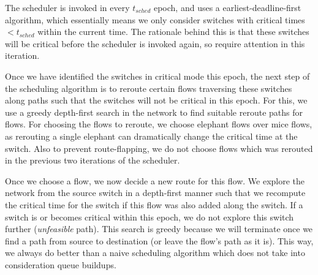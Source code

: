 The scheduler is invoked in every $t_{sched}$ epoch, and uses a 
earliest-deadline-first algorithm, which essentially means we only consider
switches with critical times $< t_{sched}$ within the current time. The rationale 
behind this is that these switches will be critical before the scheduler is invoked 
again, so require attention in this iteration. 

Once we have identified the switches in critical mode this epoch,
the next step of the scheduling algorithm is to reroute certain flows 
traversing these switches along paths 
such that the switches will not be critical in this epoch. For this, we use 
a greedy depth-first search in the network to find suitable reroute paths for
flows. For choosing the flows to reroute, we choose elephant flows over mice flows,
as rerouting a single elephant can dramatically change the critical time at the switch.
Also to prevent route-flapping, we do not choose flows which was rerouted in the previous
two iterations of the scheduler. 

Once we choose a flow, we now decide a new route for this flow. We explore the 
network from the source switch in a depth-first manner such that we recompute the
critical time for the switch if this flow was also added along the switch. If a switch 
is or becomes critical within this epoch, we do not explore this switch further (\emph{unfeasible} path). This search is greedy because we will terminate once we find a path from source
 to destination (or leave the flow's path as it is). This way, we always do better than 
 a naive scheduling algorithm which does not take into consideration queue buildups.  











